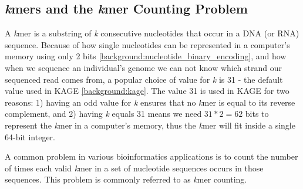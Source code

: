 \subsection{\textit{k}mers and the \textit{k}mer Counting Problem} \label{background:kmers_and_kmer_counting}
A \textit{k}mer is a substring of \textit{k} consecutive nucleotides that occur in a DNA (or RNA) sequence.
Because of how single nucleotides can be represented in a computer's memory using only 2 bits \ref{background:nucleotide_binary_encoding}, and how when we sequence an individual's genome we can not know which strand our sequenced read comes from, a popular choice of value for \textit{k} is 31 - the default value used in KAGE \ref{background:kage}.
The value 31 is used in KAGE for two reasons: 1) having an odd value for \textit{k} ensures that no \textit{k}mer is equal to its reverse complement, and 2) having \textit{k} equals 31 means we need $31*2=62$ bits to represent the \textit{k}mer in a computer's memory, thus the \textit{k}mer will fit inside a single 64-bit integer.

A common problem in various bioinformatics applications is to count the number of times each valid \textit{k}mer in a set of nucleotide sequences occurs in those sequences.
This problem is commonly referred to as \textit{k}mer counting.


